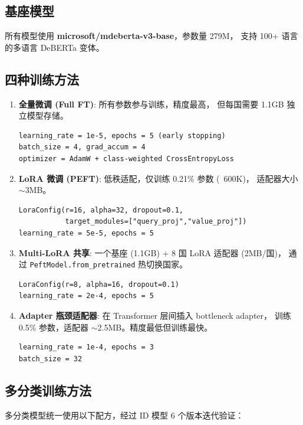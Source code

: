 \documentclass[11pt,a4paper]{article}
\begin{document}
\subsection{基座模型}

所有模型使用 \textbf{microsoft/mdeberta-v3-base}，参数量 279M，
支持 100+ 语言的多语言 DeBERTa 变体。

\subsection{四种训练方法}

\begin{enumerate}[itemsep=3pt]
\item \textbf{全量微调 (Full FT)}: 所有参数参与训练，精度最高，
但每国需要 1.1GB 独立模型存储。
\begin{verbatim}
learning_rate = 1e-5, epochs = 5 (early stopping)
batch_size = 4, grad_accum = 4
optimizer = AdamW + class-weighted CrossEntropyLoss
\end{verbatim}

\item \textbf{LoRA 微调 (PEFT)}: 低秩适配，仅训练 0.21\% 参数 (~600K)，
适配器大小 $\sim$3MB。
\begin{verbatim}
LoraConfig(r=16, alpha=32, dropout=0.1,
           target_modules=["query_proj","value_proj"])
learning_rate = 5e-5, epochs = 5
\end{verbatim}

\item \textbf{Multi-LoRA 共享}: 一个基座 (1.1GB) + 8 国 LoRA 适配器 (2MB/国)，
通过 \texttt{PeftModel.from\_pretrained} 热切换国家。
\begin{verbatim}
LoraConfig(r=8, alpha=16, dropout=0.1)
learning_rate = 2e-4, epochs = 5
\end{verbatim}

\item \textbf{Adapter 瓶颈适配器}: 在 Transformer 层间插入 bottleneck adapter，
训练 0.5\% 参数，适配器 $\sim$2.5MB。精度最低但训练最快。
\begin{verbatim}
learning_rate = 1e-4, epochs = 3
batch_size = 32
\end{verbatim}
\end{enumerate}

\subsection{多分类训练方法}

多分类模型统一使用以下配方，经过 ID 模型 6 个版本迭代验证：
\end{document}
